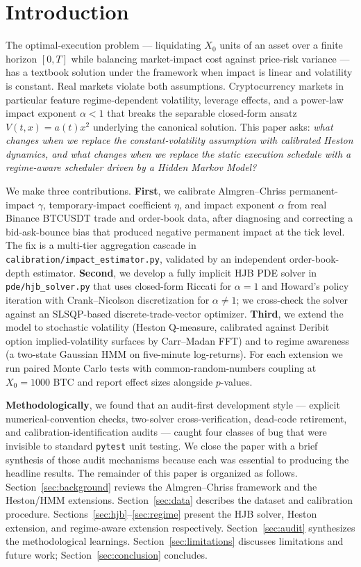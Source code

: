 \documentclass[11pt,letterpaper]{article}
\newcommand{\AC}{Almgren--Chriss}
\newcommand{\HJB}{HJB}
\begin{document}
\section{Introduction}
\label{sec:intro}

The optimal-execution problem --- liquidating \(X_0\) units of an asset over a finite horizon \([0,T]\) while balancing market-impact cost against price-risk variance --- has a textbook solution under the \citet{almgren2001optimal} framework when impact is linear and volatility is constant. Real markets violate both assumptions. Cryptocurrency markets in particular feature regime-dependent volatility, leverage effects, and a power-law impact exponent \(\alpha<1\) that breaks the separable closed-form ansatz \(V(t,x)=a(t)x^2\) underlying the canonical solution. This paper asks: \emph{what changes when we replace the constant-volatility assumption with calibrated Heston dynamics, and what changes when we replace the static execution schedule with a regime-aware scheduler driven by a Hidden Markov Model?}

We make three contributions. \textbf{First}, we calibrate \AC{} permanent-impact \(\gamma\), temporary-impact coefficient \(\eta\), and impact exponent \(\alpha\) from real Binance BTCUSDT trade and order-book data, after diagnosing and correcting a bid-ask-bounce bias that produced negative permanent impact at the tick level. The fix is a multi-tier aggregation cascade in \texttt{calibration/impact\_estimator.py}, validated by an independent order-book-depth estimator. \textbf{Second}, we develop a fully implicit \HJB{} PDE solver in \texttt{pde/hjb\_solver.py} that uses closed-form Riccati for \(\alpha=1\) and Howard's policy iteration with Crank--Nicolson discretization for \(\alpha\neq1\); we cross-check the solver against an SLSQP-based discrete-trade-vector optimizer. \textbf{Third}, we extend the model to stochastic volatility (Heston Q-measure, calibrated against Deribit option implied-volatility surfaces by Carr--Madan FFT) and to regime awareness (a two-state Gaussian HMM on five-minute log-returns). For each extension we run paired Monte Carlo tests with common-random-numbers coupling at \(X_0=1000\) BTC and report effect sizes alongside \(p\)-values.

\textbf{Methodologically}, we found that an audit-first development style --- explicit numerical-convention checks, two-solver cross-verification, dead-code retirement, and calibration-identification audits --- caught four classes of bug that were invisible to standard \texttt{pytest} unit testing. We close the paper with a brief synthesis of those audit mechanisms because each was essential to producing the headline results. The remainder of this paper is organized as follows. Section~\ref{sec:background} reviews the \AC{} framework and the Heston/HMM extensions. Section~\ref{sec:data} describes the dataset and calibration procedure. Sections~\ref{sec:hjb}--\ref{sec:regime} present the HJB solver, Heston extension, and regime-aware extension respectively. Section~\ref{sec:audit} synthesizes the methodological learnings. Section~\ref{sec:limitations} discusses limitations and future work; Section~\ref{sec:conclusion} concludes.
\end{document}
